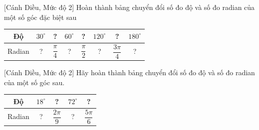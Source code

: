 \begin{bt}%
[Cánh Diều, Mức độ 2]
	Hoàn thành bảng chuyển đổi số đo độ và số đo radian của một số góc đặc biệt sau
	\begin{center}
		\begin{longtable}{|c|c|c|c|c|c|c|c|}
			\hline
			Độ & $30^\circ$ & ? & $60^\circ$ & ? & $120^\circ$ & ? & $180^\circ$\\
			\hline
			Radian & ? & $\dfrac{\pi}{4}$ & ? & $\dfrac{\pi}{2}$ & ? & $\dfrac{3\pi}{4}$ & ? \\
			\hline
		\end{longtable}
	\end{center}
\end{bt}

\begin{bt}%
[Cánh Diều, Mức độ 2]
	Hãy hoàn thành bảng chuyển đổi số đo độ và số đo radian của một số góc sau.
	\begin{center}
		\begin{longtable}{|c|c|c|c|c|}
			\hline
			Độ & $18^\circ$ & ? & $72^\circ$ & ? \\
			\hline
			Radian & ? & $\dfrac{2\pi}{9}$ & ? & $\dfrac{5\pi}{6}$\\
			\hline
		\end{longtable}
	\end{center}
\end{bt}

